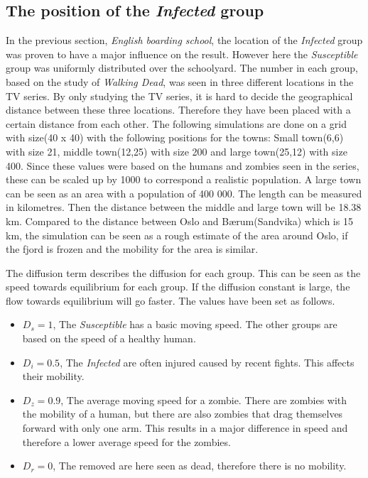 \documentclass[%
twoside,                 %
final,                   %
chapterprefix=true,      %
open=right               %
10pt]{book}
\begin{document}
\subsection{The position of the \emph{Infected} group}
In the previous section, \emph{English boarding school}, the location of the \emph{Infected} group was proven to have a major influence on the result. However here the \emph{Susceptible} group was uniformly distributed over the schoolyard. The number in each group, based on the study of \emph{Walking Dead}, was seen in three different locations in the TV series. By only studying the TV series, it is hard to decide the geographical distance between these three locations. Therefore they have been placed with a certain distance from each other. The following simulations are done on a grid with size(40 x 40) with the following positions for the towns: Small town(6,6) with size 21, middle town(12,25) with size 200 and large town(25,12) with size 400. Since these values were based on the humans and zombies seen in the series, these can be scaled up by 1000 to correspond a realistic population. A large town can be seen as an area with a population of 400 000. The length can be measured in kilometres. Then the distance between the middle and large town will be 18.38 km. Compared to the distance between Oslo and Bærum(Sandvika) which is 15 km, the simulation can be seen as a rough estimate of the area around Oslo, if the fjord is frozen and the mobility for the area is similar.


\vspace{3mm}




\vspace{3mm}


The diffusion term describes the diffusion for each group. This can be seen as the speed towards equilibrium for each group. If the diffusion constant is large, the flow towards equilibrium will go faster. The values have been set as follows. 
\begin{itemize}
\item $D_s=1$, The \emph{Susceptible} has a basic moving speed. The other groups are based on the speed of a healthy human.

\item $D_i=0.5$, The \emph{Infected} are often injured caused by recent fights. This affects their mobility.

\item $D_z=0.9$, The average moving speed for a zombie. There are zombies with the mobility of a human, but there are also zombies that drag themselves forward with only one arm. This results in a major difference in speed and therefore a lower average speed for the zombies.

\item $D_r=0$, The removed are here seen as dead, therefore there is no mobility.
\end{itemize}
\end{document}
